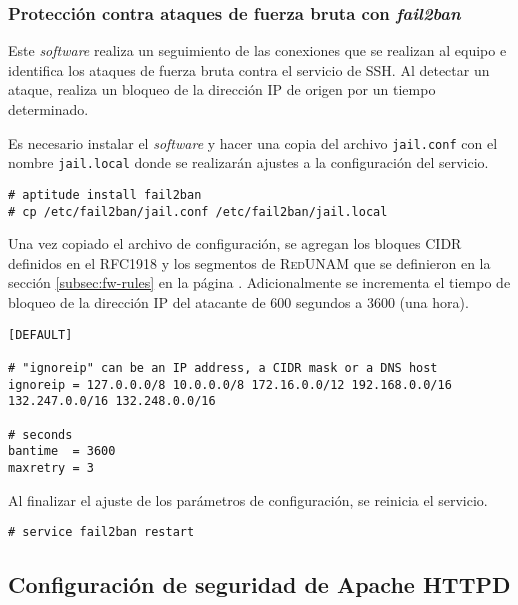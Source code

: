         \subsubsection {Protecci\'{o}n contra ataques de fuerza bruta con \textit{fail2ban}}

Este \emph{\gls{software}} realiza un seguimiento de las conexiones que se realizan al equipo e identifica los ataques de fuerza bruta contra el servicio de \textsc{\gls{SSH}}. Al detectar un ataque, realiza un bloqueo de la direcci\'{o}n \textsc{IP} de origen por un tiempo determinado.

Es necesario instalar el \emph{\gls{software}} y hacer una copia del archivo \texttt{jail.conf} con el nombre \texttt{jail.local} donde se realizar\'{a}n ajustes a la configuraci\'{o}n del servicio.

{
\scriptsize
\linespread{1}
\begin{verbatim}
# aptitude install fail2ban
# cp /etc/fail2ban/jail.conf /etc/fail2ban/jail.local
\end{verbatim}
}

Una vez copiado el archivo de configuraci\'{o}n, se agregan los bloques \textsc{CIDR} definidos en el \textsc{\gls{RFC}}1918 y los segmentos de \textsc{RedUNAM} que se definieron en la secci\'{o}n \ref{subsec:fw-rules} en la p\'{a}gina \pageref{subsec:fw-rules}. Adicionalmente se incrementa el tiempo de bloqueo de la direcci\'{o}n IP del atacante de 600 segundos a 3600 (una hora).

{
\scriptsize
\linespread{1}
\begin{verbatim}
[DEFAULT]

# "ignoreip" can be an IP address, a CIDR mask or a DNS host
ignoreip = 127.0.0.0/8 10.0.0.0/8 172.16.0.0/12 192.168.0.0/16 132.247.0.0/16 132.248.0.0/16

# seconds
bantime  = 3600
maxretry = 3
\end{verbatim}
}

Al finalizar el ajuste de los par\'{a}metros de configuraci\'{o}n, se reinicia el servicio.

{
\scriptsize
\linespread{1}
\begin{verbatim}
# service fail2ban restart
\end{verbatim}
}

      \subsection {Configuraci\'{o}n de seguridad de Apache \textsc{HTTPD}}

